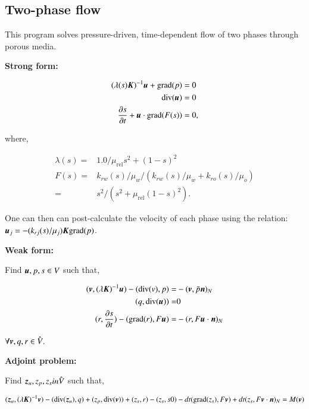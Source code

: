 \subsection{Two-phase flow}
\label{two-phase-flow}

This program solves pressure-driven, time-dependent flow of two phases
through porous media.

{\bf Strong form:}

\begin{equation}
\begin{split}
  (\lambda(s)\mbox{\boldmath$ K$})^{-1}\mbox{\boldmath$ u$} + \mathrm{grad}(p) & = 0\\
  \mathrm{div}(\mbox{\boldmath$ u$}) & = 0\\
  \frac{\partial s}{\partial t} + \mbox{\boldmath$ u$}\cdot\mathrm{grad}(F(s)) & = 0,
\end{split}
\end{equation}

where,

\begin{equation}
\begin{split}
  \lambda(s) = & 1.0/\mu_{\mathrm{rel}} s^2 + (1 - s)^2 \\
        F(s) = & k_{rw}(s)/\mu_w/(k_{rw}(s)/\mu_w + k_{ro}(s)/\mu_o) \\
             = & s^2/(s^2 + \mu_{\mathrm{rel}}(1 - s)^2).
\end{split}
\end{equation}

One can then can post-calculate the velocity of each phase using the
relation: $\mbox{\boldmath$ u$}_j = - (k_{rj}(s)/\mu_j)\mbox{\boldmath$ K$}\mathrm{grad}(p)$.

{\bf Weak form:}

Find $\mbox{\boldmath$ u$}, p, s \in V$ such that,

\begin{equation}
\begin{split}
(\mbox{\boldmath$ v$}, (\lambda\mbox{\boldmath$ K$})^{-1}\mbox{\boldmath$ u$}) - (\mathrm{div}(v), p) = & - (\mbox{\boldmath$ v$}, \bar{p}\mbox{\boldmath$ n$})_N \\
                           (q, \mathrm{div}(\mbox{\boldmath$ u$})) = & 0\\
(r, \frac{\partial s}{\partial t}) - (\mathrm{grad}(r), F\mbox{\boldmath$ u$}) = & - (r,
F\mbox{\boldmath$ u$}\cdot\mbox{\boldmath$ n$})_N
\end{split}
\end{equation}

$\forall \mbox{\boldmath$ v$}, q, r \in \hat{V}.$

{\bf Adjoint problem:}

Find $\mbox{\boldmath$ z$}_u, z_p, z_s in \hat{V}$ such that,

\begin{equation}
(\mbox{\boldmath$ z$}_u, (\lambda\mbox{\boldmath$ K$})^{-1}\mbox{\boldmath$ v$}) - (\mathrm{div}(\mbox{\boldmath$ z$}_u), q) + (z_p, \mathrm{div}(\mbox{\boldmath$ v$}))
+ (z_s, r) - (z_s, s0) - dt (\mathrm{grad}(z_s), F\mbox{\boldmath$ v$}) + dt (z_s,
F\mbox{\boldmath$ v$}\cdot\mbox{\boldmath$ n$})_N = M(\mbox{\boldmath$ v$})
\end{equation}

